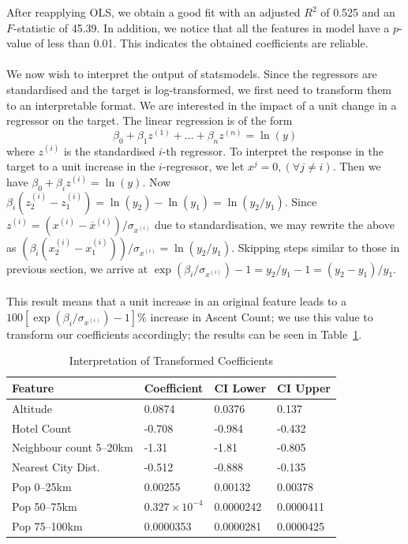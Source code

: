 \documentclass[11pt,a4paper]{article}
\begin{document}
After reapplying OLS, we obtain a good fit with an adjusted $R^{2}$ of 0.525 and an $F$-statistic of 45.39. In addition, we notice that all the features in model have a $p$-value of less than 0.01. This indicates the obtained coefficients are reliable. \\  \\
We now wish to interpret the output of statsmodels. Since the regressors are standardised and the target is log-transformed, we first need to transform them to an interpretable format. We are interested in the impact of a unit change in a regressor on the target. The linear regression is of the form 
$$\beta_0+\beta_1z^{(1)}+ \dots + \beta_n z^{(n)}=\ln(y)$$ 
where $z^{(i)}$ is the standardised $i$-th regressor. To interpret the response in the target to a unit increase in the $i$-regressor, we let $x^j = 0, (\forall j \neq i)$. Then we have $\beta_0 + \beta_i z^{(i)} = \ln(y)$. Now $\beta_i (z_2^{(i)} - z_1^{(i)}) = \ln(y_2) - \ln(y_1)=\ln(y_2/y_1)$. Since 
$z^{(i)} = (x^{(i)} - \overline{x}^{(i)})/\sigma_{x^{(i)}}$
due to standardisation, we may rewrite the above as $(\beta_i (x_2^{(i)} - x_1^{(i)}))/\sigma_{x^{(i)}} =\ln(y_2/y_1)$. Skipping steps similar to those in previous section, we arrive at $\exp(\beta_i / \sigma_{x^{(i)}}) - 1 = y_2 / y_1 - 1 = (y_2 - y_1) / y_1$. \\ \\
This result means that a unit increase in an original feature leads to a $100[\exp(\beta_i / \sigma_{x^{(i)}}) - 1]\%$ increase in Ascent Count; we use this value to transform our coefficients accordingly; the results can be seen in Table~\ref{table:2}.
\begin{table} [h!]
\centering
\caption{Interpretation of Transformed Coefficients}
\begin{tabular}{|l|l|l|l|}
\toprule
               Feature &  Coefficient &  CI Lower &  CI Upper \\
\midrule
              Altitude &       0.0874 &    0.0376 &     0.137 \\
           Hotel Count &       -0.708 &    -0.984 &    -0.432 \\
Neighbour count 5–20km &        -1.31 &     -1.81 &    -0.805 \\
    Nearest City Dist. &       -0.512 &    -0.888 &    -0.135 \\
            Pop 0–25km &      0.00255 &   0.00132 &   0.00378 \\
           Pop 50–75km &     $0.327 \times 10^{-4}$ &  0.0000242 &  0.0000411 \\
          Pop 75–100km &     0.0000353 &  0.0000281 &  0.0000425
\bottomrule
\label{table:2}
\end{tabular}
\end{table} \\
\end{document}
